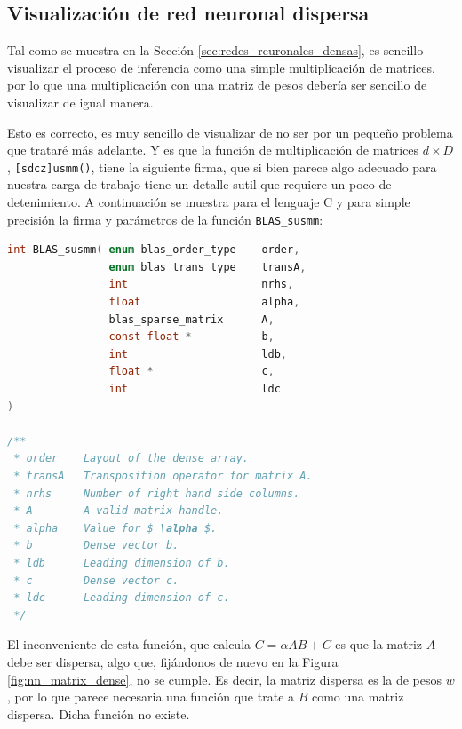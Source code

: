 \subsection{Visualización de red neuronal dispersa}
\label{ssec:visualizacion_nn_dispersa}
Tal como se muestra en la Sección \ref{sec:redes_reuronales_densas}, es sencillo visualizar el proceso de inferencia como una simple multiplicación de matrices, por lo que una multiplicación con una matriz de pesos debería ser sencillo de visualizar de igual manera.

Esto es correcto, es muy sencillo de visualizar de no ser por un pequeño problema que trataré más adelante. Y es que la función de multiplicación de matrices $d\times D$, \texttt{[sdcz]usmm()}, tiene la siguiente firma, que si bien parece algo adecuado para nuestra carga de trabajo tiene un detalle sutil que requiere un poco de detenimiento. A continuación se muestra para el lenguaje C y para simple precisión la firma y parámetros de la función \texttt{BLAS\_susmm}:

\begin{lstlisting}[language=C]
int BLAS_susmm( enum blas_order_type    order,
                enum blas_trans_type    transA,
                int                     nrhs,
                float                   alpha,
                blas_sparse_matrix      A,
                const float *           b,
                int                     ldb,
                float *                 c,
                int                     ldc 
)

/**
 * order    Layout of the dense array.
 * transA   Transposition operator for matrix A.
 * nrhs     Number of right hand side columns.
 * A        A valid matrix handle.
 * alpha    Value for $ \alpha $.
 * b        Dense vector b.
 * ldb      Leading dimension of b.
 * c        Dense vector c.
 * ldc      Leading dimension of c.
 */
\end{lstlisting}

El inconveniente de esta función, que calcula $C = \alpha AB + C$ es que la matriz $A$ debe ser dispersa, algo que, fijándonos de nuevo en la Figura \ref{fig:nn_matrix_dense}, no se cumple. Es decir, la matriz dispersa es la de pesos $w$, por lo que parece necesaria una función que trate a $B$ como una matriz dispersa. Dicha función no existe.

